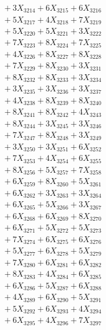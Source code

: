 \documentclass[a4paper,10pt]{article}
\begin{document}
{\begin{align}
&\;  + 3 X_{3214} + 6 X_{3215} + 6 X_{3216} \\[0.3ex]
&\;  + 5 X_{3217} + 4 X_{3218} + 7 X_{3219} \\[0.5ex]\allowbreak
&\;  + 5 X_{3220} + 5 X_{3221} + 3 X_{3222} \\[0.3ex]
&\;  + 7 X_{3223} + 8 X_{3224} + 7 X_{3225} \\[0.3ex]
&\;  + 4 X_{3226} + 8 X_{3227} + 8 X_{3228} \\[0.3ex]
&\;  + 7 X_{3229} + 8 X_{3230} + 3 X_{3231} \\[0.3ex]
&\;  + 8 X_{3232} + 8 X_{3233} + 3 X_{3234} \\[0.3ex]
&\;  + 3 X_{3235} + 3 X_{3236} + 3 X_{3237} \\[0.3ex]
&\;  + 4 X_{3238} + 8 X_{3239} + 8 X_{3240} \\[0.3ex]
&\;  + 8 X_{3241} + 8 X_{3242} + 4 X_{3243} \\[0.3ex]
&\;  + 8 X_{3244} + 3 X_{3245} + 3 X_{3246} \\[0.3ex]
&\;  + 7 X_{3247} + 8 X_{3248} + 3 X_{3249} \\[0.5ex]\allowbreak
&\;  + 3 X_{3250} + 3 X_{3251} + 6 X_{3252} \\[0.3ex]
&\;  + 7 X_{3253} + 4 X_{3254} + 6 X_{3255} \\[0.3ex]
&\;  + 8 X_{3256} + 5 X_{3257} + 7 X_{3258} \\[0.3ex]
&\;  + 6 X_{3259} + 8 X_{3260} + 5 X_{3261} \\[0.3ex]
&\;  + 6 X_{3262} + 3 X_{3263} + 3 X_{3264} \\[0.3ex]
&\;  + 6 X_{3265} + 5 X_{3266} + 3 X_{3267} \\[0.3ex]
&\;  + 6 X_{3268} + 6 X_{3269} + 8 X_{3270} \\[0.3ex]
&\;  + 6 X_{3271} + 5 X_{3272} + 5 X_{3273} \\[0.3ex]
&\;  + 7 X_{3274} + 6 X_{3275} + 6 X_{3276} \\[0.3ex]
&\;  + 5 X_{3277} + 6 X_{3278} + 5 X_{3279} \\[0.5ex]\allowbreak
&\;  + 7 X_{3280} + 6 X_{3281} + 6 X_{3282} \\[0.3ex]
&\;  + 8 X_{3283} + 4 X_{3284} + 6 X_{3285} \\[0.3ex]
&\;  + 6 X_{3286} + 5 X_{3287} + 6 X_{3288} \\[0.3ex]
&\;  + 4 X_{3289} + 6 X_{3290} + 5 X_{3291} \\[0.3ex]
&\;  + 5 X_{3292} + 6 X_{3293} + 4 X_{3294} \\[0.3ex]
&\;  + 6 X_{3295} + 4 X_{3296} + 7 X_{3297} \\[0.3ex]

\end{align}}
\end{document}
